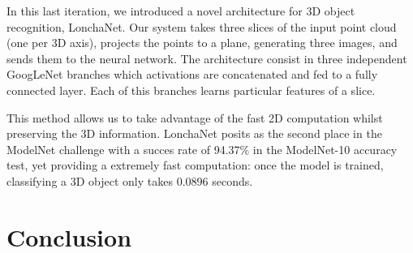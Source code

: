 In this last iteration, we introduced a novel architecture for 3D object recognition, LonchaNet. Our system takes three slices of the input point cloud (one per 3D axis), projects the points to a plane, generating three images, and sends them to the neural network. The architecture consist in three independent GoogLeNet branches which activations are concatenated and fed to a fully connected layer. Each of this branches learns particular features of a slice.

This method allows us to take advantage of the fast 2D computation whilst preserving the 3D information. LonchaNet posits as the second place in the ModelNet challenge with a succes rate of 94.37\% in the ModelNet-10 accuracy test, yet providing a extremely fast computation: once the model is trained, classifying a 3D object only takes $0.0896$ seconds.

\section{Conclusion}
\label{cha:objrecog:sec:conclusion}

